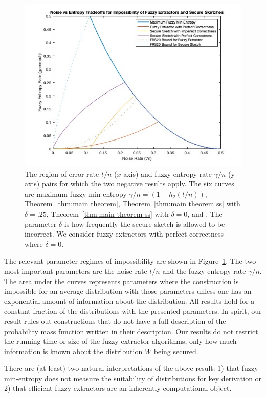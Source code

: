 \begin{figure}[t]
\centering
\includegraphics[width=.9\textwidth]{EntropyvsError.jpg}
\caption{The region of error rate $t/n$ ($x$-axis) and fuzzy entropy rate $\gamma/n$ (y-axis) pairs for which the two negative results apply.  The six curves are maximum fuzzy min-entropy $\gamma/n = (1-h_2(t/n))$, Theorem~\ref{thm:main theorem}, Theorem~\ref{thm:main theorem ss} with $\delta=.25$,  Theorem~\ref{thm:main theorem ss} with $\delta =0$, \cite[Theorem 5.1]{fuller2020fuzzy} and \cite[Theorem 7.2]{fuller2020fuzzy}. The parameter $\delta$ is how frequently the secure sketch is allowed to be incorrect.  We consider fuzzy extractors with perfect correctness where $\delta=0$.}
\label{fig:param regime}
\end{figure}
 The relevant parameter regimes of impossibility are shown in Figure~\ref{fig:param regime}.  The two most important parameters are the noise rate $t/n$ and the fuzzy entropy rate $\gamma/n$. The area under the curves represents parameters where the construction is impossible for an average distribution with those parameters unless one has an exponential amount of information about the distribution.  All results hold for a constant fraction of the distributions with the presented parameters.
In spirit, our result rules out constructions that do not have a full description of the probability mass function written in their description.  Our results do not restrict the running time or size of the fuzzy extractor algorithms, only how much information is known about the distribution $W$ being secured.  





There are (at least) two natural interpretations of the above result: 1) that fuzzy min-entropy does not measure the suitability of distributions for key derivation or 2) that efficient fuzzy extractors are an inherently computational object.


